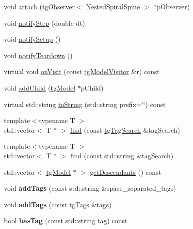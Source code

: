 \begin{DoxyCompactItemize}
\item 
void \hyperlink{classtg_subject_a56ecfd33a048c3a7f1a884318d9af548}{attach} (\hyperlink{classtg_observer}{tg\-Observer}$<$ \hyperlink{class_nested_spiral_spine}{Nested\-Spiral\-Spine} $>$ $\ast$p\-Observer)
\item 
void \hyperlink{classtg_subject_ad9640aa7fcc1e0b4ce8a913a4ce1ea42}{notify\-Step} (double dt)
\item 
void \hyperlink{classtg_subject_a80799e5d0c8512d3d05a55764790392b}{notify\-Setup} ()
\item 
void \hyperlink{classtg_subject_adf7a60dbb0faf0de5528f862e7953e63}{notify\-Teardown} ()
\item 
virtual void \hyperlink{classtg_model_aee6457e0fc54d5570b87bfc779f9b1c0}{on\-Visit} (const \hyperlink{classtg_model_visitor}{tg\-Model\-Visitor} \&r) const 
\item 
void \hyperlink{classtg_model_a292c17848b96caee32b2286e44c13f2f}{add\-Child} (\hyperlink{classtg_model}{tg\-Model} $\ast$p\-Child)
\item 
virtual std\-::string \hyperlink{classtg_model_af37b0c1a6d4060bfe0bb9b5038a17725}{to\-String} (std\-::string prefix=\char`\"{}\char`\"{}) const 
\item 
{\footnotesize template$<$typename T $>$ }\\std\-::vector$<$ T $\ast$ $>$ \hyperlink{classtg_model_ab75836fdfbd9200f165c3b28a19630c0}{find} (const \hyperlink{classtg_tag_search}{tg\-Tag\-Search} \&tag\-Search)
\item 
{\footnotesize template$<$typename T $>$ }\\std\-::vector$<$ T $\ast$ $>$ \hyperlink{classtg_model_aa40b5fb32f8941e04d537f4e6c6db35c}{find} (const std\-::string \&tag\-Search)
\item 
std\-::vector$<$ \hyperlink{classtg_model}{tg\-Model} $\ast$ $>$ \hyperlink{classtg_model_a2efa4321fa5c77b4ce23b01f6fd3a1c4}{get\-Descendants} () const 
\item 
\hypertarget{classtg_taggable_af0b8f1729653b0b90d2fecbd51163612}{void {\bfseries add\-Tags} (const std\-::string \&space\-\_\-separated\-\_\-tags)}\label{classtg_taggable_af0b8f1729653b0b90d2fecbd51163612}

\item 
\hypertarget{classtg_taggable_af28e3fe1a7e4eb28772dc006d575dd1f}{void {\bfseries add\-Tags} (const \hyperlink{classtg_tags}{tg\-Tags} \&tags)}\label{classtg_taggable_af28e3fe1a7e4eb28772dc006d575dd1f}

\item 
\hypertarget{classtg_taggable_ae31f65869c8887bfeb34a344902c4d5b}{bool {\bfseries has\-Tag} (const std\-::string tag) const }\label{classtg_taggable_ae31f65869c8887bfeb34a344902c4d5b}


\end{DoxyCompactItemize}
